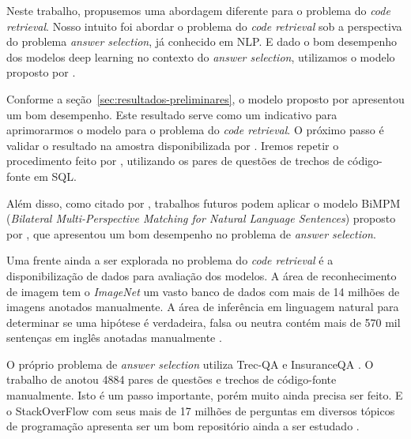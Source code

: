 \documentclass[12pt]{article}
\begin{document}
Neste trabalho, propusemos uma abordagem diferente para o problema do \textit{code retrieval}. Nosso intuito foi abordar o problema do \textit{code retrieval} sob a perspectiva do problema \textit{answer selection}, já conhecido em NLP. E dado o bom desempenho dos modelos deep learning no contexto do \textit{answer selection}, utilizamos o modelo proposto por \cite{tan-lstm-qa}.

Conforme a seção~\ref{sec:resultados-preliminares}, o modelo proposto por \cite{tan-lstm-qa} apresentou um bom desempenho. Este resultado serve como um indicativo para aprimorarmos o modelo para o problema do \textit{code retrieval}. O próximo passo é validar o resultado na amostra disponibilizada por \cite{iyer-etal-2016-summarizing}. Iremos repetir o procedimento feito por \cite{Yao-staqc:2018}, utilizando os pares de questões de trechos de código-fonte em SQL.

Além disso, como citado por \cite{lai-etal-2018-review}, trabalhos futuros podem aplicar o modelo BiMPM (\textit{Bilateral Multi-Perspective Matching for Natural Language Sentences}) proposto por \cite{wang-BiMPM-2017}, que apresentou um bom desempenho no problema de \textit{answer selection}.

Uma frente ainda a ser explorada no problema do \textit{code retrieval} é a disponibilização de dados para avaliação dos modelos. A área de reconhecimento de imagem tem o \textit{ImageNet} \cite{imagenet_cvpr09} um vasto banco de dados com mais de 14 milhões de imagens anotados manualmente. A área de inferência em linguagem natural para determinar se uma hipótese é verdadeira, falsa ou neutra contém mais de 570 mil sentenças em inglês anotadas manualmente \cite{snli:emnlp2015}. 

O próprio problema de \textit{answer selection} utiliza Trec-QA \cite{wang-etal-2007-jeopardy} e InsuranceQA \cite{feng-answer-selection-2015}. O trabalho de \cite{Yao-staqc:2018} anotou 4884 pares de questões e trechos de código-fonte manualmente. Isto é um passo importante, porém muito ainda precisa ser feito. E o StackOverFlow com seus mais de 17 milhões de perguntas em diversos tópicos de programação apresenta ser um bom repositório ainda a ser estudado \cite{stackoverflow-survey-2019}.







\end{document}
